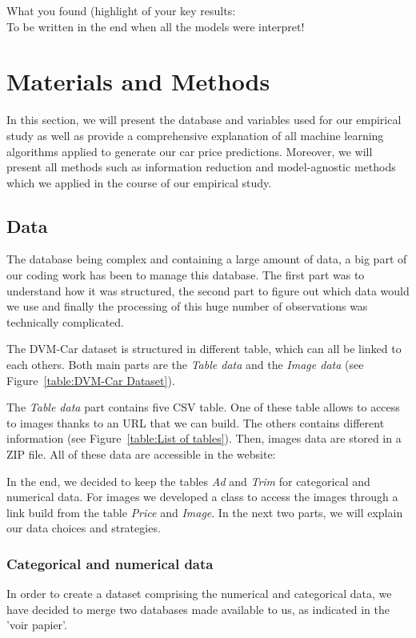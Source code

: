 \documentclass[12pt]{article}
\begin{document}
\noindent What you found (highlight of your key results: \\
\noindent To be written in the end when all the models were interpret!


\section{Materials and Methods}
In this section, we will present the database and variables used for our empirical study as well as provide a comprehensive explanation of all machine learning algorithms applied to generate our car price predictions. Moreover, we will present all methods such as information reduction and model-agnostic methods which we applied in the course of our empirical study.

\subsection{Data}
\noindent The database being complex and containing a large amount of data, a big part of our coding work has been to manage this database. The first part was to understand how it was structured, the second part to figure out which data would we use and finally the processing of this huge number of observations was technically complicated.

\noindent The DVM-Car dataset is structured in different table, which can all be linked to each others. Both main parts are the \textit{Table data} and the \textit{Image data} (see Figure~\ref{table:DVM-Car Dataset}). 



\noindent The \textit{Table data} part contains five CSV table. One of these table allows to access to images thanks to an URL that we can build. The others contains different information (see Figure~\ref{table:List of tables}). 
Then, images data are stored in a ZIP file. 
All of these data are accessible in the website: 



\noindent In the end, we decided to keep the tables \textit{Ad\table} and \textit{Trim} for categorical and numerical data. For images we developed a class to access the images through a link build from the table \textit{Price} and \textit{Image}.
\noindent In the next two parts, we will explain our data choices and strategies. 

\subsubsection{Categorical and numerical data}
\noindent In order to create a dataset comprising the numerical and categorical data, we have decided to merge two databases made available to us, as indicated in the 'voir papier'.\\
\end{document}
